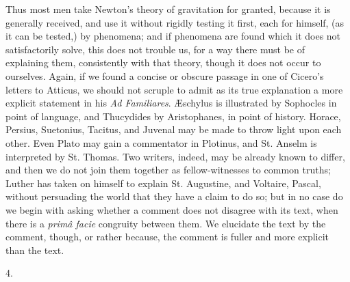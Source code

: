 Thus most men take Newton's theory of gravitation for granted, because it is generally received, and use it
without rigidly testing it first, each for himself, (as
it can be tested,) by phenomena; and if phenomena are
found which it does not satisfactorily solve, this does
not trouble us, for a way there must be of explaining
them, consistently with that theory, though it does not
occur to ourselves. Again, if we found a concise or
obscure passage in one of Cicero's letters to Atticus, we
should not scruple to admit as its true explanation a
more explicit statement in his \emph{Ad Familiares}. Æschylus is illustrated by Sophocles in point of
language, and Thucydides by Aristophanes, in point of
history. Horace, Persius, Suetonius, Tacitus, and Juvenal
may be made to throw light upon each other. Even Plato
may gain a commentator in Plotinus, and St. Anselm is
interpreted by St. Thomas. Two writers, indeed, may be
already known to differ, and then we do not join them
together as fellow-witnesses to common truths; Luther has
taken on himself to explain St. Augustine, and Voltaire,
Pascal, without persuading the world that they have a
claim to do so; but in no case do we begin with asking
whether a comment does not disagree with its text, when
there is a \emph{primâ facie} congruity between them. We
elucidate the text by the comment, though, or rather
because, the comment is fuller and more explicit than the
text.

4.

